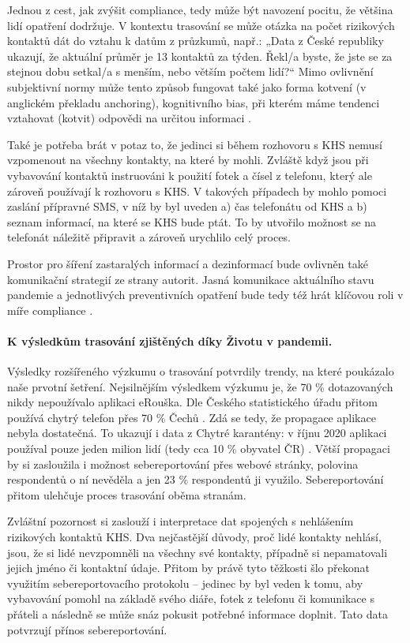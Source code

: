 Jednou z cest, jak zvýšit compliance, tedy může být navození pocitu, že většina lidí opatření dodržuje. V kontextu trasování se může otázka na počet rizikových kontaktů dát do vztahu k datům z průzkumů, např.: „Data z České republiky ukazují, že aktuální průměr je 13 kontaktů za týden. Řekl/a byste, že jste se za stejnou dobu setkal/a s menším, nebo větším počtem lidí?“ Mimo ovlivnění subjektivní normy může tento způsob fungovat také jako forma kotvení (v anglickém překladu anchoring), kognitivního bias, při kterém máme tendenci vztahovat (kotvit) odpovědi na určitou informaci \cite{Tversky1974}.

Také je potřeba brát v potaz to, že jedinci si během rozhovoru s KHS nemusí vzpomenout na všechny kontakty, na které by mohli. Zvláště když jsou při vybavování kontaktů instruováni k použití fotek a čísel z telefonu, který ale zároveň používají k rozhovoru s KHS. V takových případech by mohlo pomoci zaslání přípravné SMS, v níž by byl uveden a) čas telefonátu od KHS a b) seznam informací, na které se KHS bude ptát. To by utvořilo možnost se na telefonát náležitě připravit a zároveň urychlilo celý proces.

Prostor pro šíření zastaralých informací a dezinformací bude ovlivněn také komunikační strategií ze strany autorit. Jasná komunikace aktuálního stavu pandemie a jednotlivých preventivních opatření bude tedy též hrát klíčovou roli v míře compliance \cite{Hyland-Wood2021}. 

\paragraph*{K výsledkům trasování zjištěných díky Životu v pandemii.}
Výsledky rozšířeného výzkumu o trasování potvrdily trendy, na které poukázalo naše prvotní šetření. Nejsilnějším výsledkem výzkumu je, že 70 \% dotazovaných nikdy nepoužívalo aplikaci eRouška. Dle Českého statistického úřadu přitom používá chytrý telefon přes 70 \% Čechů \cite{Mana2020}. Zdá se tedy, že propagace aplikace nebyla dostatečná. To ukazují i data z Chytré karantény: v říjnu 2020 aplikaci používal pouze jeden milion lidí (tedy cca 10 \% obyvatel ČR) \cite{Fiser2020}. Větší propagaci by si zasloužila i možnost sebereportování přes webové stránky, polovina respondentů o ní nevěděla a jen 23 \% respondentů ji využilo. Sebereportování přitom ulehčuje proces trasování oběma stranám. 

Zvláštní pozornost si zaslouží i interpretace dat spojených s nehlášením rizikových kontaktů KHS. Dva nejčastější důvody, proč lidé kontakty nehlásí, jsou, že si lidé nevzpomněli na všechny své kontakty, případně si nepamatovali jejich jméno či kontaktní údaje. Přitom by právě tyto těžkosti šlo překonat využitím sebereportovacího protokolu -- jedinec by byl veden k tomu, aby vybavování pomohl na základě svého diáře, fotek z telefonu či komunikace s přáteli a následně se může snáz pokusit potřebné informace doplnit. Tato data potvrzují přínos sebereportování.

